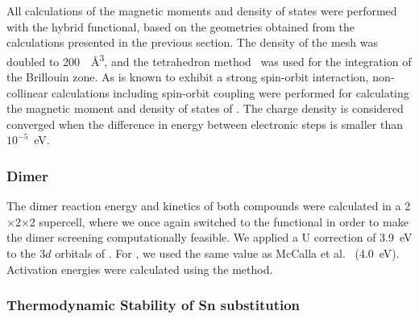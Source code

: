 \begin{refsection}
All calculations of the magnetic moments and density of states were performed 
with the hybrid  functional, based on the geometries obtained from 
the calculations presented in the previous section. The density of the
 mesh was doubled to 200~\si{\per\angstrom\cubed}, and the 
tetrahedron method~\cite{Blochl1994a} was used for the integration of the 
Brillouin zone. As  is known to exhibit a strong spin-orbit interaction, 
non-collinear calculations including spin-orbit coupling were performed for 
calculating the magnetic moment and density of states of . The 
charge density is considered converged when the difference in energy between 
electronic steps is smaller than $10^{-5}$~\si{\electronvolt}.
 
 \label{appendix:sec-dimer} 
\subsubsection{Dimer} 

The dimer reaction energy and kinetics of both compounds were calculated in a 
2$\times$2$\times$2 supercell, where we once again switched to the  
functional in order to make the dimer screening computationally feasible. 
We applied a U correction of 3.9~\si{\electronvolt} to the 3$d$ orbitals of 
. For , we used the same value as McCalla et al.~\cite{McCalla2015} 
(4.0~\si{\electronvolt}). Activation energies were calculated using the 
 method. 

 \label{appendix:sec-sn_stability}
\subsubsection{Thermodynamic Stability of Sn substitution}  


\end{refsection}
